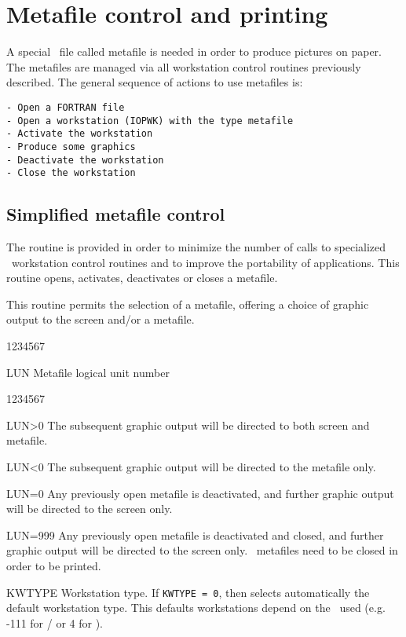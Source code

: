 %
%

\section{Metafile control and printing}
A special \ASCII~file called metafile is needed in order to produce pictures
on paper. The metafiles are managed via all workstation control routines
previously described. The general sequence of actions to use metafiles is:
\begin{verbatim}
- Open a FORTRAN file
- Open a workstation (IOPWK) with the type metafile
- Activate the workstation
- Produce some graphics
- Deactivate the workstation
- Close the workstation
\end{verbatim}
%
\subsection{Simplified metafile control}
The routine  is provided in order to minimize the number of
calls to specialized \HIGZ~workstation control routines and to improve
the portability of applications. This routine opens, activates, deactivates
or closes a metafile.

\Action
This routine permits the selection of a metafile, offering a choice of graphic
output to the screen and/or a metafile.
\Pdesc
\begin{DLtt}{1234567}
\item[LUN] Metafile logical unit number
\begin{DLtt}{1234567}
\item[LUN>0] The subsequent graphic output will be directed to both screen and
             metafile.
\item[LUN<0] The subsequent graphic output will be directed to the metafile
             only.
\item[LUN=0] Any previously open metafile is deactivated, and further graphic
             output will be directed to the screen only.
\item[LUN=999] Any previously open metafile is deactivated and closed, and
               further graphic output will be directed to the screen only.
               \PS~metafiles need to be closed in order to be printed.
\end{DLtt}
\item[KWTYPE] Workstation type. If {\tt KWTYPE = 0}, then  selects
              automatically the default workstation type. This defaults
              workstations depend on the \UGP~used (e.g. -111 for
	      \HIGZ/ or 4 for \GKSGRAL).
\end{DLtt}
%
